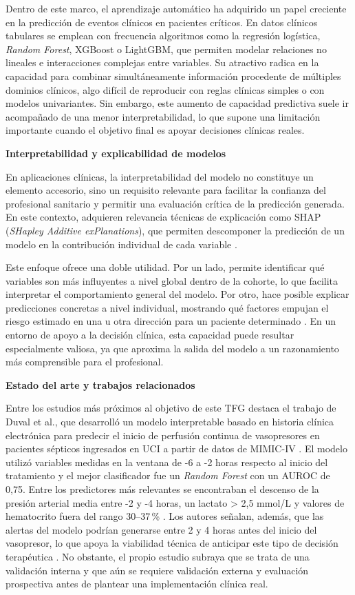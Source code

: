 Dentro de este marco, el aprendizaje automático ha adquirido un papel creciente en la predicción de eventos clínicos en pacientes críticos. En datos clínicos tabulares se emplean con frecuencia algoritmos como la regresión logística, \textit{Random Forest}, XGBoost o LightGBM, que permiten modelar relaciones no lineales e interacciones complejas entre variables. Su atractivo radica en la capacidad para combinar simultáneamente información procedente de múltiples dominios clínicos, algo difícil de reproducir con reglas clínicas simples o con modelos univariantes. Sin embargo, este aumento de capacidad predictiva suele ir acompañado de una menor interpretabilidad, lo que supone una limitación importante cuando el objetivo final es apoyar decisiones clínicas reales.

\textbf{Interpretabilidad y explicabilidad de modelos}

En aplicaciones clínicas, la interpretabilidad del modelo no constituye un elemento accesorio, sino un requisito relevante para facilitar la confianza del profesional sanitario y permitir una evaluación crítica de la predicción generada. En este contexto, adquieren relevancia técnicas de explicación como SHAP (\textit{SHapley Additive exPlanations}), que permiten descomponer la predicción de un modelo en la contribución individual de cada variable \cite{lundberg2017}.

Este enfoque ofrece una doble utilidad. Por un lado, permite identificar qué variables son más influyentes a nivel global dentro de la cohorte, lo que facilita interpretar el comportamiento general del modelo. Por otro, hace posible explicar predicciones concretas a nivel individual, mostrando qué factores empujan el riesgo estimado en una u otra dirección para un paciente determinado \cite{lundberg2017}. En un entorno de apoyo a la decisión clínica, esta capacidad puede resultar especialmente valiosa, ya que aproxima la salida del modelo a un razonamiento más comprensible para el profesional.

\textbf{Estado del arte y trabajos relacionados}

Entre los estudios más próximos al objetivo de este TFG destaca el trabajo de Duval et al., que desarrolló un modelo interpretable basado en historia clínica electrónica para predecir el inicio de perfusión continua de vasopresores en pacientes sépticos ingresados en UCI a partir de datos de MIMIC-IV \cite{duval2025}. El modelo utilizó variables medidas en la ventana de -6 a -2 horas respecto al inicio del tratamiento y el mejor clasificador fue un \textit{Random Forest} con un AUROC de 0,75. Entre los predictores más relevantes se encontraban el descenso de la presión arterial media entre -2 y -4 horas, un lactato > 2,5 mmol/L y valores de hematocrito fuera del rango 30--37\,\% \cite{duval2025}. Los autores señalan, además, que las alertas del modelo podrían generarse entre 2 y 4 horas antes del inicio del vasopresor, lo que apoya la viabilidad técnica de anticipar este tipo de decisión terapéutica \cite{duval2025}. No obstante, el propio estudio subraya que se trata de una validación interna y que aún se requiere validación externa y evaluación prospectiva antes de plantear una implementación clínica real.

